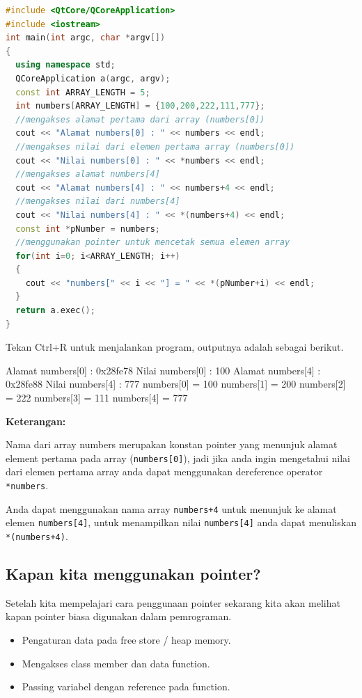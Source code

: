 \begin{lstlisting}[language=c++, caption=Pointer dan Array, label=pointer-dan-array, label=contoh5-4]
#include <QtCore/QCoreApplication>
#include <iostream>
int main(int argc, char *argv[])
{
  using namespace std;
  QCoreApplication a(argc, argv);
  const int ARRAY_LENGTH = 5;
  int numbers[ARRAY_LENGTH] = {100,200,222,111,777};
  //mengakses alamat pertama dari array (numbers[0])
  cout << "Alamat numbers[0] : " << numbers << endl;
  //mengakses nilai dari elemen pertama array (numbers[0])
  cout << "Nilai numbers[0] : " << *numbers << endl;
  //mengakses alamat numbers[4]
  cout << "Alamat numbers[4] : " << numbers+4 << endl;
  //mengakses nilai dari numbers[4]
  cout << "Nilai numbers[4] : " << *(numbers+4) << endl;
  const int *pNumber = numbers;
  //menggunakan pointer untuk mencetak semua elemen array
  for(int i=0; i<ARRAY_LENGTH; i++)
  {
    cout << "numbers[" << i << "] = " << *(pNumber+i) << endl;
  }
  return a.exec();
}
\end{lstlisting}

Tekan Ctrl+R untuk menjalankan program, outputnya adalah sebagai
berikut.

\begin{lcverbatim}
Alamat numbers[0] : 0x28fe78
Nilai numbers[0] : 100
Alamat numbers[4] : 0x28fe88
Nilai numbers[4] : 777
numbers[0] = 100
numbers[1] = 200
numbers[2] = 222
numbers[3] = 111
numbers[4] = 777
\end{lcverbatim}

\textbf{Keterangan:}

Nama dari array numbers merupakan konstan pointer yang menunjuk alamat
element pertama pada array (\texttt{numbers{[}0{]}}), jadi jika anda
ingin mengetahui nilai dari elemen pertama array anda dapat menggunakan
dereference operator \texttt{*numbers}.

Anda dapat menggunakan nama array \texttt{numbers+4} untuk menunjuk ke
alamat elemen \texttt{numbers{[}4{]}}, untuk menampilkan nilai
\texttt{numbers{[}4{]}} anda dapat menuliskan \texttt{*(numbers+4)}.

\subsection{Kapan kita menggunakan
pointer?}\label{kapan-kita-menggunakan-pointer}

Setelah kita mempelajari cara penggunaan pointer sekarang kita akan
melihat kapan pointer biasa digunakan dalam pemrograman.

\begin{itemize}

\item
  Pengaturan data pada free store / heap memory.
\item
  Mengakses class member dan data function.
\item
  Passing variabel dengan reference pada function.
\end{itemize}

